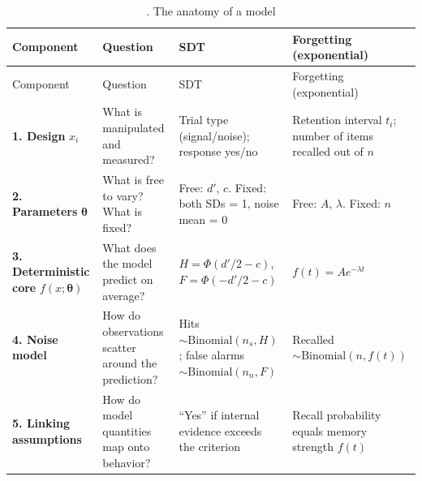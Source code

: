 \begin{longtable}[]{@{}
  >{\raggedright\arraybackslash}p{}
  >{\raggedright\arraybackslash}p{}
  >{\raggedright\arraybackslash}p{}
  >{\raggedright\arraybackslash}p{}@{}}
\caption{. The anatomy of a model}\tabularnewline
\toprule\noalign{}
\begin{minipage}[b]{\linewidth}\raggedright
Component
\end{minipage} & \begin{minipage}[b]{\linewidth}\raggedright
Question
\end{minipage} & \begin{minipage}[b]{\linewidth}\raggedright
SDT
\end{minipage} & \begin{minipage}[b]{\linewidth}\raggedright
Forgetting (exponential)
\end{minipage} \\
\midrule\noalign{}
\endfirsthead
\toprule\noalign{}
\begin{minipage}[b]{\linewidth}\raggedright
Component
\end{minipage} & \begin{minipage}[b]{\linewidth}\raggedright
Question
\end{minipage} & \begin{minipage}[b]{\linewidth}\raggedright
SDT
\end{minipage} & \begin{minipage}[b]{\linewidth}\raggedright
Forgetting (exponential)
\end{minipage} \\
\midrule\noalign{}
\endhead
\bottomrule\noalign{}
\endlastfoot
\textbf{1. Design} \(x_i\) & What is manipulated and measured? & Trial
type (signal/noise); response yes/no & Retention interval \(t_i\);
number of items recalled out of \(n\) \\
\textbf{2. Parameters} \(\boldsymbol\theta\) & What is free to vary?
What is fixed? & Free: \(d'\), \(c\). Fixed: both SDs = 1, noise mean =
0 & Free: \(A\), \(\lambda\). Fixed: \(n\) \\
\textbf{3. Deterministic core} \(f(x;\boldsymbol\theta)\) & What does
the model predict on average? & \(H = \Phi(d'/2 - c)\),
\(F = \Phi(-d'/2 - c)\) & \(f(t) = A e^{-\lambda t}\) \\
\textbf{4. Noise model} & How do observations scatter around the
prediction? & Hits \(\sim \mathrm{Binomial}(n_s, H)\); false alarms
\(\sim \mathrm{Binomial}(n_n, F)\) & Recalled
\(\sim \mathrm{Binomial}(n, f(t))\) \\
\textbf{5. Linking assumptions} & How do model quantities map onto
behavior? & ``Yes'' if internal evidence exceeds the criterion & Recall
probability equals memory strength \(f(t)\) \\
\end{longtable}

